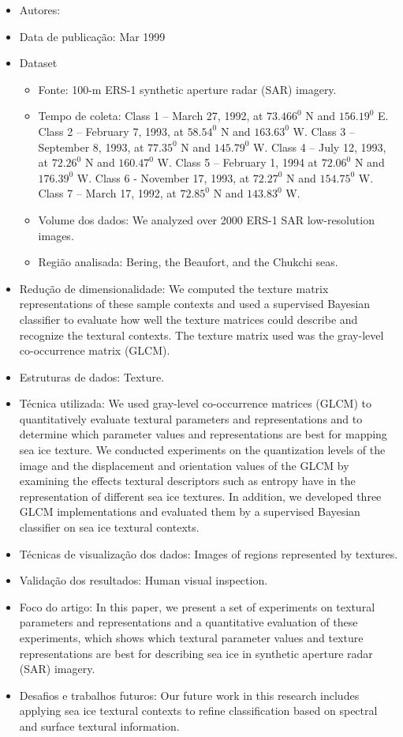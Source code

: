 \documentclass[paper=a4, fontsize=11pt]{scrartcl}
\begin{document}
\begin{itemize}
    \item Autores:~\cite{soh1999texture}
    \item Data de publicação: Mar 1999 
    \item Dataset
    \begin{itemize}
        \item Fonte: 100-m ERS-1 synthetic aperture radar (SAR) imagery.
        \item Tempo de coleta: 
        Class 1 -- March 27, 1992, at $73.466^0$ N and $156.19^0$ E. 
        Class 2 -- February 7, 1993, at $58.54^0$ N and $163.63^0$ W.
        Class 3 -- September 8, 1993, at $77.35^0$ N and $145.79^0$ W.
        Class 4 -- July 12, 1993, at $72.26^0$ N and $160.47^0$ W.
        Class 5 -- February 1, 1994 at $72.06^0$ N and $176.39^0$ W.
        Class 6 - November 17, 1993, at $72.27^0$ N and $154.75^0$ W.
        Class 7 -- March 17, 1992, at $72.85^0$ N and $143.83^0$ W.
        \item Volume dos dados: We analyzed over 2000 ERS-1 SAR low-resolution images.
        \item Região analisada: Bering, the Beaufort, and the Chukchi seas.
    \end{itemize}
    \item Redução de dimensionalidade: We computed the texture matrix representations of these sample contexts and used a supervised Bayesian classifier to evaluate how well the texture matrices could describe and recognize the textural contexts. The texture matrix used was the gray-level co-occurrence matrix (GLCM).
    \item Estruturas de dados: Texture.
    \item Técnica utilizada: We used gray-level co-occurrence matrices (GLCM) to quantitatively evaluate textural parameters and representations and to determine which parameter values and representations are best for mapping sea ice texture. We conducted experiments on the quantization levels of the image and the displacement  and orientation values of the GLCM by examining the effects textural descriptors such as entropy have in the representation of different sea ice textures. In addition, we developed three GLCM implementations and evaluated them by a supervised Bayesian classifier on sea ice textural contexts.
    \item Técnicas de visualização dos dados: Images of regions represented by textures.
    \item Validação dos resultados: Human visual inspection.
    \item Foco do artigo: In this paper, we present a set of experiments on textural parameters and representations and a quantitative evaluation of these experiments, which shows which textural parameter values and texture representations are best for describing sea ice in synthetic aperture radar (SAR) imagery. 
    \item Desafios e trabalhos futuros: Our future work in this research includes applying sea ice textural contexts to refine classification based on spectral and surface textural information.
\end{itemize}
\end{document}
